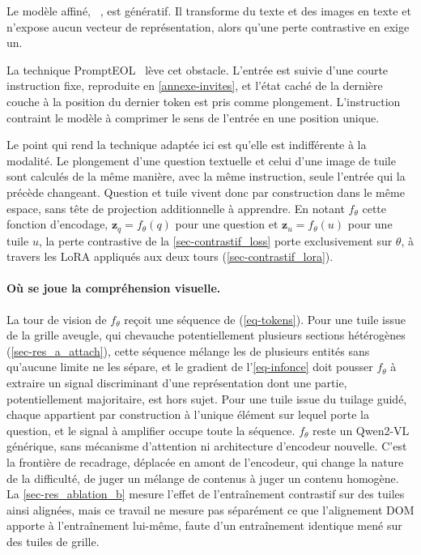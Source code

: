 Le modèle affiné, ~\citep{qwen2vl2024}, est
génératif. Il transforme du texte et des images en texte et n'expose aucun
vecteur de représentation, alors qu'une perte contrastive en exige un.
 
La technique PromptEOL~\citep{prompteol2024} lève cet obstacle. L'entrée est
suivie d'une courte instruction fixe, reproduite en \cref{annexe-invites}, et
l'état caché de la dernière couche à la position du dernier token est pris comme
plongement. L'instruction contraint le modèle à comprimer le sens de l'entrée en
une position unique.
 
Le point qui rend la technique adaptée ici est qu'elle est indifférente à la
modalité. Le plongement d'une question textuelle et celui d'une image de tuile
sont calculés de la même manière, avec la même instruction, seule l'entrée qui
la précède changeant. Question et tuile vivent donc par construction dans le
même espace, sans tête de projection additionnelle à apprendre. En notant
$f_\theta$ cette fonction d'encodage, $\mathbf{z}_q = f_\theta(q)$ pour une
question et $\mathbf{z}_u = f_\theta(u)$ pour une tuile $u$, la perte
contrastive de la \cref{sec-contrastif_loss} porte exclusivement sur $\theta$, à
travers les LoRA appliqués aux deux tours (\cref{sec-contrastif_lora}).
 
\paragraph{Où se joue la compréhension visuelle.} La tour de vision de
$f_\theta$ reçoit une séquence de  (\cref{eq-tokens}). Pour une
tuile issue de la grille aveugle, qui chevauche potentiellement plusieurs
sections hétérogènes (\cref{sec-res_a_attach}), cette séquence mélange les
 de plusieurs entités sans qu'aucune limite ne les sépare, et
le gradient de l'\cref{eq-infonce} doit pousser $f_\theta$ à extraire un signal
discriminant d'une représentation dont une partie, potentiellement majoritaire,
est hors sujet. Pour une tuile issue du tuilage guidé, chaque 
appartient par construction à l'unique élément sur lequel porte la question, et
le signal à amplifier occupe toute la séquence. $f_\theta$ reste un Qwen2-VL
générique, sans mécanisme d'attention ni architecture d'encodeur nouvelle. C'est
la frontière de recadrage, déplacée en amont de l'encodeur, qui change la nature
de la difficulté, de juger un mélange de contenus à juger un contenu homogène.
La \cref{sec-res_ablation_b} mesure l'effet de l'entraînement contrastif sur des
tuiles ainsi alignées, mais ce travail ne mesure pas séparément ce que
l'alignement DOM apporte à l'entraînement lui-même, faute d'un entraînement
identique mené sur des tuiles de grille.
 
